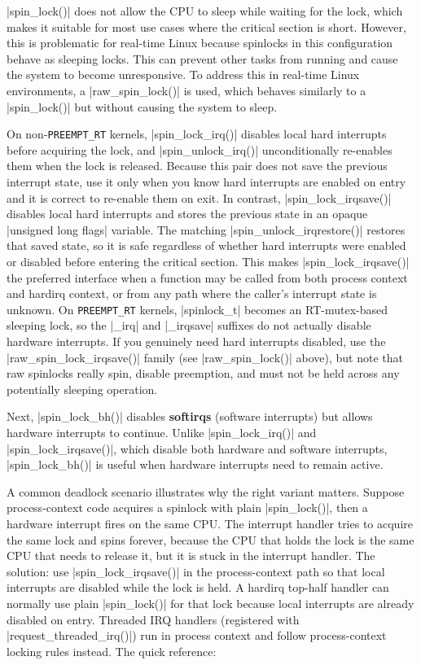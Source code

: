 \documentclass[10pt, oneside]{book}
\begin{document}
\cpp|spin_lock()| does not allow the CPU to sleep while waiting for the lock, which makes it suitable for most use cases where the critical section is short.
However, this is problematic for real-time Linux because spinlocks in this configuration behave as sleeping locks.
This can prevent other tasks from running and cause the system to become unresponsive.
To address this in real-time Linux environments, a \cpp|raw_spin_lock()| is used, which behaves similarly to a \cpp|spin_lock()| but without causing the system to sleep.

On non-\verb|PREEMPT_RT| kernels, \cpp|spin_lock_irq()| disables local hard interrupts before acquiring the lock, and \cpp|spin_unlock_irq()| unconditionally re-enables them when the lock is released.
Because this pair does not save the previous interrupt state, use it only when you know hard interrupts are enabled on entry and it is correct to re-enable them on exit.
In contrast, \cpp|spin_lock_irqsave()| disables local hard interrupts and stores the previous state in an opaque \cpp|unsigned long flags| variable.
The matching \cpp|spin_unlock_irqrestore()| restores that saved state, so it is safe regardless of whether hard interrupts were enabled or disabled before entering the critical section.
This makes \cpp|spin_lock_irqsave()| the preferred interface when a function may be called from both process context and hardirq context, or from any path where the caller's interrupt state is unknown.
On \verb|PREEMPT_RT| kernels, \cpp|spinlock_t| becomes an RT-mutex-based sleeping lock, so the \cpp|_irq| and \cpp|_irqsave| suffixes do not actually disable hardware interrupts.
If you genuinely need hard interrupts disabled, use the \cpp|raw_spin_lock_irqsave()| family (see \cpp|raw_spin_lock()| above), but note that raw spinlocks really spin, disable preemption, and must not be held across any potentially sleeping operation.

Next, \cpp|spin_lock_bh()| disables \textbf{softirqs} (software interrupts) but allows hardware interrupts to continue.
Unlike \cpp|spin_lock_irq()| and \cpp|spin_lock_irqsave()|, which disable both hardware and software interrupts, \cpp|spin_lock_bh()| is useful when hardware interrupts need to remain active.

A common deadlock scenario illustrates why the right variant matters.
Suppose process-context code acquires a spinlock with plain \cpp|spin_lock()|, then a hardware interrupt fires on the same CPU.
The interrupt handler tries to acquire the same lock and spins forever, because the CPU that holds the lock is the same CPU that needs to release it, but it is stuck in the interrupt handler.
The solution: use \cpp|spin_lock_irqsave()| in the process-context path so that local interrupts are disabled while the lock is held.
A hardirq top-half handler can normally use plain \cpp|spin_lock()| for that lock because local interrupts are already disabled on entry.
Threaded IRQ handlers (registered with \cpp|request_threaded_irq()|) run in process context and follow process-context locking rules instead.
The quick reference:
\end{document}
